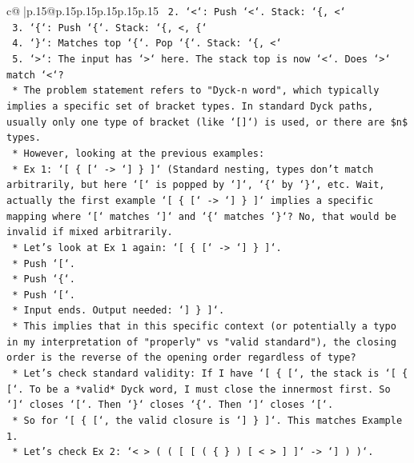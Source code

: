 \documentclass{article}
\begin{document}
{\begin{supertabular}{c@{$\;$}|p{.15\linewidth}@{}p{.15\linewidth}p{.15\linewidth}p{.15\linewidth}p{.15\linewidth}p{.15\linewidth}}
{{{\texttt{        2.  `<`: Push `<`. Stack: `\{, <`} \\
\texttt{        3.  `\{`: Push `\{`. Stack: `\{, <, \{`} \\
\texttt{        4.  `\}`: Matches top `\{`. Pop `\{`. Stack: `\{, <`} \\
\texttt{        5.  `>`: The input has `>` here. The stack top is now `<`. Does `>` match `<`?} \\
\texttt{            *   The problem statement refers to "Dyck{-}n word", which typically implies a specific set of bracket types. In standard Dyck paths, usually only one type of bracket (like `{[}{]}`) is used, or there are \$n\$ types.} \\
\texttt{            *   However, looking at the previous examples:} \\
\texttt{                *   Ex 1: `{[} \{ {[}` {-}> `{]} \} {]}` (Standard nesting, types don't match arbitrarily, but here `{[}` is popped by `{]}`, `\{` by `\}`, etc. Wait, actually the first example `{[} \{ {[}` {-}> `{]} \} {]}` implies a specific mapping where `{[}` matches `{]}` and `\{` matches `\}`? No, that would be invalid if mixed arbitrarily.} \\
\texttt{                *   Let's look at Ex 1 again: `{[} \{ {[}` {-}> `{]} \} {]}`.} \\
\texttt{                    *   Push `{[}`.} \\
\texttt{                    *   Push `\{`.} \\
\texttt{                    *   Push `{[}`.} \\
\texttt{                    *   Input ends. Output needed: `{]} \} {]}`.} \\
\texttt{                    *   This implies that in this specific context (or potentially a typo in my interpretation of "properly" vs "valid standard"), the closing order is the reverse of the opening order regardless of type?} \\
\texttt{                    *   Let's check standard validity: If I have `{[} \{ {[}`, the stack is `{[} \{ {[}`. To be a *valid* Dyck word, I must close the innermost first. So `{]}` closes `{[}`. Then `\}` closes `\{`. Then `{]}` closes `{[}`.} \\
\texttt{                    *   So for `{[} \{ {[}`, the valid closure is `{]} \} {]}`. This matches Example 1.} \\
\texttt{                *   Let's check Ex 2: `< > ( ( {[} {[} ( \{ \} ) {[} < > {]} {]}` {-}> `{]} ) )`.} \\
}}}
\end{supertabular}}
\end{document}
